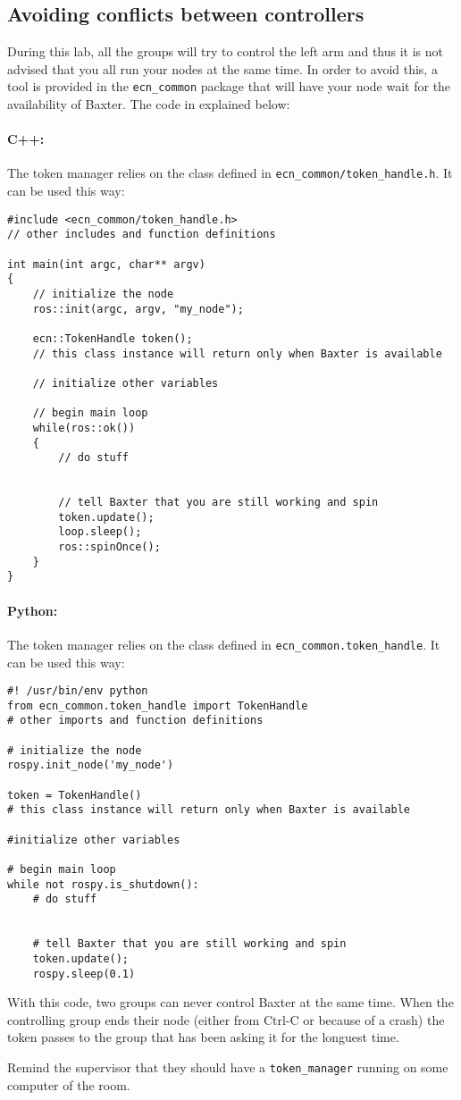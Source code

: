 \documentclass{ecnreport}
\begin{document}
 \subsection{Avoiding conflicts between controllers}
 
 During this lab, all the groups will try to control the left arm and thus it is not advised
 that you all run your nodes at the same time. In order to avoid this, a tool is provided in the  \texttt{ecn\_common}
 package that will have your node wait for the availability of Baxter. The code in explained below:
 
 \paragraph{C++: } The token manager relies on the class defined in \texttt{ecn\_common/token\_handle.h}. It can be used this way:
\cppstyle \begin{lstlisting}
#include <ecn_common/token_handle.h>
// other includes and function definitions

int main(int argc, char** argv)
{
    // initialize the node
    ros::init(argc, argv, "my_node");

    ecn::TokenHandle token();
    // this class instance will return only when Baxter is available
    
    // initialize other variables

    // begin main loop
    while(ros::ok())
    {
        // do stuff
        

        // tell Baxter that you are still working and spin
        token.update();
        loop.sleep();
        ros::spinOnce();
    }
}
\end{lstlisting}


 \paragraph{Python: } The token manager relies on the class defined in \texttt{ecn\_common.token\_handle}. It can be used this way:
\pythonstyle \begin{lstlisting}
#! /usr/bin/env python
from ecn_common.token_handle import TokenHandle
# other imports and function definitions

# initialize the node
rospy.init_node('my_node')

token = TokenHandle()
# this class instance will return only when Baxter is available

#initialize other variables

# begin main loop
while not rospy.is_shutdown():
    # do stuff
    
    
    # tell Baxter that you are still working and spin
    token.update();
    rospy.sleep(0.1)

\end{lstlisting}
With this code, two groups can never control Baxter at the same time. When the controlling group ends their node (either from Ctrl-C or because of a crash) the token
passes to the group that has been asking it for the longuest time.

Remind the supervisor that they should have a \texttt{token\_manager} running on some computer of the room.
\end{document}
